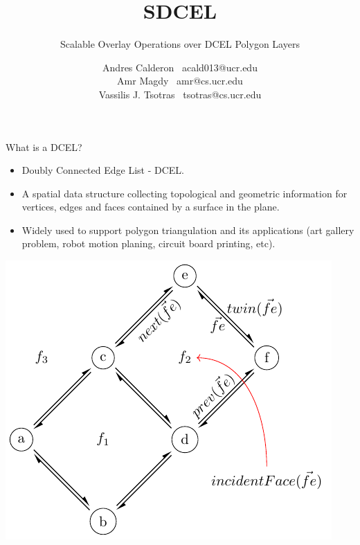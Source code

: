 \documentclass{beamer}
\title{SDCEL}
\subtitle{Scalable Overlay Operations over DCEL Polygon Layers}
\author{
    Andres Calderon \textperiodcentered \ acald013@ucr.edu \\
    Amr Magdy \textperiodcentered \ amr@cs.ucr.edu \\ 
    Vassilis J. Tsotras \textperiodcentered \ tsotras@cs.ucr.edu
}
\institute{University of California, Riverside}
\begin{document}
    \begin{frame}
        \maketitle
    \end{frame}

    \begin{frame}{What is a DCEL?}
        \begin{minipage}{0.65\textwidth}
        \begin{itemize}
            \item Doubly Connected Edge List - DCEL.
            \item A spatial data structure collecting topological and geometric information for vertices, edges and faces contained by a surface in the plane.
            \item Widely used to support polygon triangulation and its applications (art gallery problem, robot motion planing, circuit board printing, etc).
        \end{itemize}
        \end{minipage}\hfill %
        \begin{minipage}{0.34\textwidth}
            \centering
            \includegraphics[width=\textwidth]{figures/dcel_example}
        \end{minipage}
    \end{frame}
\end{document}
